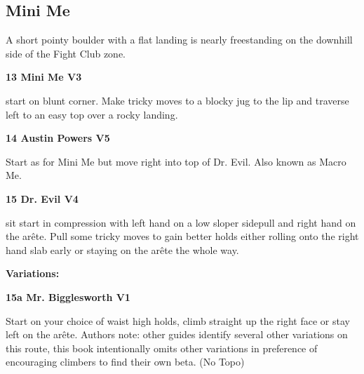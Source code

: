\begin{multicols}{2}
\needspace{1.5cm}
\subsection*{Mini Me}\label{bf:Mini Me}
A short pointy boulder with a flat landing is nearly freestanding on the downhill side of the Fight Club zone.\\
	


\needspace{1.5cm}
\label{rt:Mini Me}
\colorbox{green!20}{
\parbox{0.95\linewidth}{
\textbf{
13 Mini Me V3  
}}}

\begin{adjustwidth}{0.5cm}{}			
start on blunt corner. Make tricky moves to a blocky jug to the lip and traverse left to an easy top over a rocky landing.
\end{adjustwidth}



\needspace{1.5cm}
\label{rt:Austin Powers}
\colorbox{RoyalBlue!20}{
\parbox{0.95\linewidth}{
\textbf{
14 Austin Powers V5  
}}}

\begin{adjustwidth}{0.5cm}{}			
Start as for Mini Me but move right into top of Dr. Evil. Also known as Macro Me.
\end{adjustwidth}



\needspace{1.5cm}
\label{rt:Dr. Evil}
\colorbox{RoyalBlue!20}{
\parbox{0.95\linewidth}{
\textbf{
15 Dr. Evil V4  
}}}

\begin{adjustwidth}{0.5cm}{}			
sit start in compression with left hand on a low sloper sidepull and right hand on the arête. Pull some tricky moves to gain better holds either rolling onto the right hand slab early or staying on the arête the whole way.
\end{adjustwidth}

\begin{adjustwidth}{0.5cm}{}				
\needspace{3cm}
\textbf{Variations:} \newline

\needspace{1.5cm}
\label{vr:Mr. Bigglesworth}
\colorbox{green!20}{
\parbox{0.95\linewidth}{
\textbf{
15a Mr. Bigglesworth V1  
}}}

\begin{adjustwidth}{0.5cm}{}			
Start on your choice of waist high holds, climb straight up the right face or stay left on the arête. Authors note: other guides identify several other variations on this route, this book intentionally omits other variations in preference of encouraging climbers to find their own beta. (No Topo)
\end{adjustwidth}



\end{adjustwidth}
\end{multicols}

